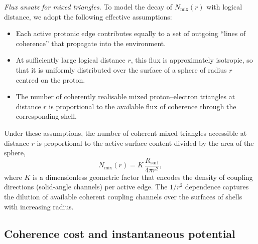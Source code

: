\documentclass[11pt,a4paper]{article}
\begin{document}
\begin{mdframed}[linewidth=0.5pt]
\noindent\textit{Flux ansatz for mixed triangles.}
To model the decay of $N_{\mathrm{mix}}(r)$ with logical distance, we adopt the following effective assumptions:
\begin{itemize}
  \item[(B1)] Each active protonic edge contributes equally to a set of outgoing ``lines of coherence'' that propagate into the environment.
  \item[(B2)] At sufficiently large logical distance $r$, this flux is approximately isotropic, so that it is uniformly distributed over the surface of a sphere of radius $r$ centred on the proton.
  \item[(B3)] The number of coherently realisable mixed proton--electron triangles at distance $r$ is proportional to the available flux of coherence through the corresponding shell.
\end{itemize}
Under these assumptions, the number of coherent mixed triangles accessible at distance $r$ is proportional to the active surface content divided by the area of the sphere,
\begin{equation}
N_{\mathrm{mix}}(r) = K\,\frac{R_{\mathrm{surf}}}{4\pi r^{2}},
\label{eq:NmixAnsatz}
\end{equation}
where $K$ is a dimensionless geometric factor that encodes the density of coupling directions (solid-angle channels) per active edge. The $1/r^{2}$ dependence captures the dilution of available coherent coupling channels over the surfaces of shells with increasing radius.
\end{mdframed}

\subsection{Coherence cost and instantaneous potential}
\end{document}
